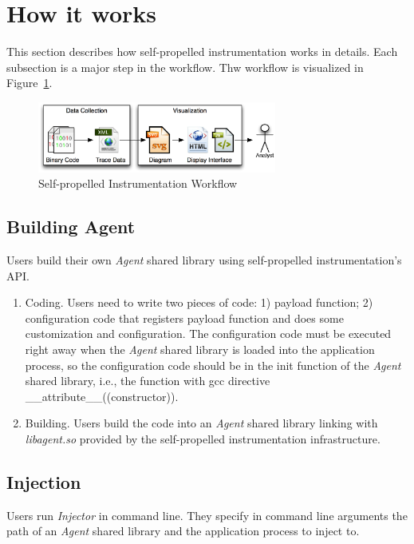 \section{How it works}
This section describes how self-propelled instrumentation works in details.
Each subsection is a major step in the workflow.
Thw workflow is visualized in Figure~\ref{fig:workflow}.


\begin{figure}[ht]
  \centering
  \includegraphics[width=0.70\textwidth]{figure/workflow.eps} 
  \caption{Self-propelled Instrumentation Workflow} \label{fig:workflow}
\end{figure}

\subsection{Building Agent}
Users build their own {\em Agent} shared library using self-propelled
instrumentation's API.
\begin{enumerate}
\item Coding. Users need to write two pieces of code: 1) payload function; 2)
  configuration code that registers payload function and does some customization
  and configuration. The configuration code must be executed right away when the
  {\em Agent} shared library is loaded into the application process, so the
  configuration code should be in the init function of the {\em Agent} shared
  library, i.e., the function with gcc directive
  \_\_attribute\_\_((constructor)).
\item Building. Users build the code into an {\em Agent} shared library linking
  with {\em libagent.so} provided by the self-propelled instrumentation
  infrastructure.
\end{enumerate}

\subsection{Injection}
Users run {\em Injector} in command line. They specify in command line arguments
the path of an {\em Agent} shared library and the application process to inject
to.

